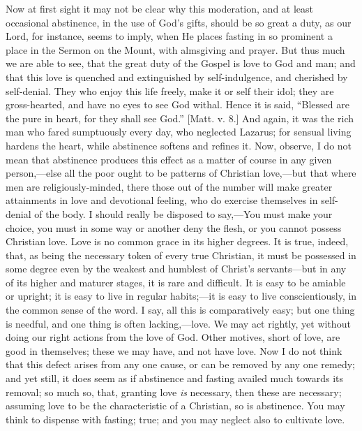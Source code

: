 Now at first sight it may not be clear why this moderation, and at
least occasional abstinence, in the use of God's gifts, should be so
great a duty, as our Lord, for instance, seems to imply, when He places
fasting in so prominent a place in the Sermon on the Mount, with
almsgiving and prayer. But thus much we are able to see, that the great
duty of the Gospel is love to God and man; and that this love is
quenched and extinguished by self-indulgence, and cherished by
self-denial. They who enjoy this life freely, make it or self their
idol; they are gross-hearted, and have no eyes to see God withal. Hence
it is said, ``Blessed are the pure in heart, for they shall see
God.'' [Matt. v. 8.] And again, it was the rich man who fared
sumptuously every day, who neglected Lazarus; for sensual living hardens
the heart, while abstinence softens and refines it. Now, observe, I do
not mean that abstinence produces this effect as a matter of course in
any given person,—else all the poor ought to be patterns of Christian
love,—but that where men are religiously-minded, there those out of
the number will make greater attainments in love and devotional feeling,
who do exercise themselves in self-denial of the body. I should really
be disposed to say,—You must make your choice, you must in some way or
another deny the flesh, or you cannot possess Christian love. Love is no
common grace in its higher degrees. It is true, indeed, that, as being
the necessary token of every true Christian, it must be possessed in
some degree even by the weakest and humblest of Christ's servants—but
in any of its higher and maturer stages, it is rare and difficult. It is
easy to be amiable or upright; it is easy to live in regular habits;—it
is easy to live conscientiously, in the common sense of the word. I say,
all this is comparatively easy; but one thing is needful, and one thing
is often lacking,—love. We may act rightly, yet without doing our
right actions from the love of God. Other motives, short of love, are
good in themselves; these we may have, and not have love. Now I do not
think that this defect arises from any one cause, or can be removed by
any one remedy; and yet still, it does seem as if abstinence and fasting
availed much towards its removal; so much so, that, granting love \emph{is}
necessary, then these are necessary; assuming love to be the
characteristic of a Christian, so is abstinence. You may think to
dispense with fasting; true; and you may neglect also to cultivate love.

